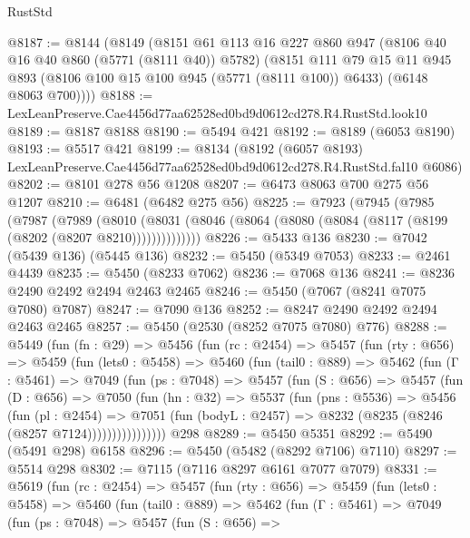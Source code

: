 \begin{lexlean}{RustStd}
\begin{coremodule}
@8187 := @8144
    (@8149
      (@8151
        @61
        @113
        @16
        @227
        @860
        @947
        (@8106 @40 @16 @40 @860 (@5771 (@8111 @40)) @5782)
        (@8151
          @111
          @79
          @15
          @11
          @945
          @893
          (@8106 @100 @15 @100 @945 (@5771 (@8111 @100)) @6433)
          (@6148 @8063 @700))))
@8188 := LexLeanPreserve.Cae4456d77aa62528ed0bd9d0612cd278.R4.RustStd.look10
@8189 := @8187 @8188
@8190 := @5494 @421
@8192 := @8189 (@6053 @8190)
@8193 := @5517 @421
@8199 := @8134
    (@8192 (@6057 @8193) LexLeanPreserve.Cae4456d77aa62528ed0bd9d0612cd278.R4.RustStd.fal10 @6086)
@8202 := @8101 @278 @56 @1208
@8207 := @6473 @8063 @700 @275 @56 @1207
@8210 := @6481 (@6482 @275 @56)
@8225 := @7923
    (@7945
      (@7985
        (@7987
          (@7989
            (@8010
              (@8031 (@8046 (@8064 (@8080 (@8084 (@8117 (@8199 (@8202 (@8207 @8210))))))))))))))
@8226 := @5433 @136
@8230 := @7042 (@5439 @136) (@5445 @136)
@8232 := @5450 (@5349 @7053)
@8233 := @2461 @4439
@8235 := @5450 (@8233 @7062)
@8236 := @7068 @136
@8241 := @8236 @2490 @2492 @2494 @2463 @2465
@8246 := @5450 (@7067 (@8241 @7075 @7080) @7087)
@8247 := @7090 @136
@8252 := @8247 @2490 @2492 @2494 @2463 @2465
@8257 := @5450 (@2530 (@8252 @7075 @7080) @776)
@8288 := @5449
    (fun (fn : @29) =>
    @5456
      (fun (rc : @2454) =>
      @5457
        (fun (rty : @656) =>
        @5459
          (fun (lets0 : @5458) =>
          @5460
            (fun (tail0 : @889) =>
            @5462
              (fun (Γ : @5461) =>
              @7049
                (fun (ps : @7048) =>
                @5457
                  (fun (S : @656) =>
                  @5457
                    (fun (D : @656) =>
                    @7050
                      (fun (hn : @32) =>
                      @5537
                        (fun (pns : @5536) =>
                        @5456
                          (fun (pl : @2454) =>
                          @7051
                            (fun (bodyL : @2457) => @8232 (@8235 (@8246 (@8257 @7124))))))))))))))))
    @298
@8289 := @5450 @5351
@8292 := @5490 (@5491 @298) @6158
@8296 := @5450 (@5482 (@8292 @7106) @7110)
@8297 := @5514 @298
@8302 := @7115 (@7116 @8297 @6161 @7077 @7079)
@8331 := @5619
    (fun (rc : @2454) =>
    @5457
      (fun (rty : @656) =>
      @5459
        (fun (lets0 : @5458) =>
        @5460
          (fun (tail0 : @889) =>
          @5462
            (fun (Γ : @5461) =>
            @7049
              (fun (ps : @7048) =>
              @5457
                (fun (S : @656) =>

\end{coremodule}
\end{lexlean}
